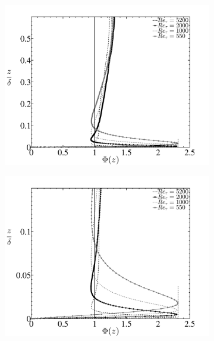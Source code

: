 \begin{figure}
\centering
\begin{subfigure}[t]{0.5\textwidth}
\includegraphics[width = \linewidth]{Figure/highRe.pdf}
\end{subfigure}%
\begin{subfigure}[t]{0.5\textwidth}
\includegraphics[width = \linewidth]{Figure/highRe2.pdf}
\end{subfigure}
\begin{subfigure}[t]{0.65\textwidth}

\end{subfigure}
\end{figure}
